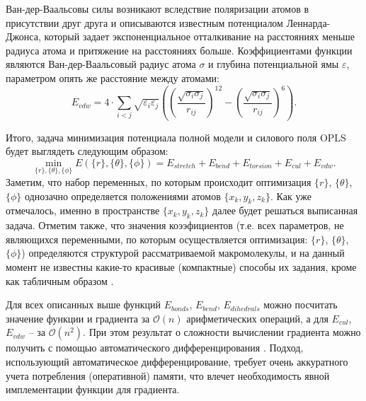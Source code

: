   Ван-дер-Ваальсовы силы возникают вследствие поляризации атомов в присутствии друг друга и описываются известным потенциалом Леннарда-Джонса, который задает экспоненциальное отталкивание на расстояниях меньше радиуса атома и притяжение на расстояниях больше.
  Коэффициентами функции являются Ван-дер-Ваальсовый радиус атома $\sigma$ и глубина потенциальной ямы $\varepsilon$, параметром опять же расстояние между атомами:
  $$
  E_{vdw} = 4 \cdot \sum_{i < j} \sqrt{\varepsilon_i \varepsilon_j} \left( \left( \frac{\sqrt{\sigma_i \sigma_j}}{r_{ij}} \right)^{12} - \left( \frac{\sqrt{\sigma_i \sigma_j}}{r_{ij}} \right)^{6} \right).
  $$

  Итого, задача минимизация потенциала полной модели и силового поля OPLS будет выглядеть следующим образом:
  $$
  \min_{\{r\},\{\theta\},\{\phi\}} {E(\{r\},\{\theta\},\{\phi\}) = E_{stretch} + E_{bend} + E_{torsion} + E_{cul} + E_{vdw}}.
  $$
  Заметим, что набор переменных, по которым происходит оптимизация $\{r\}$, $\{\theta\}$, $\{\phi\}$ однозачно определяется положениями атомов $\{x_k ,y_k ,z_k\}$. Как уже отмечалось, именно в пространстве $\{x_k ,y_k ,z_k\}$ далее будет решаться выписанная задача. Отметим также, что значения коээфициентов (т.е. всех параметров, не являющихся переменными, по которым осуществляется оптимизация: $\{r\}$, $\{\theta\}$, $\{\phi\}$) определяются структурой рассматриваемой макромолекулы, и на данный момент не известны какие-то красивые (компактные) способы их задания, кроме как табличным образом \cite{Jorgensen1996}.


  Для всех описанных выше функций $E_{bonds}$, $E_{bend}$, $E_{dihedrals}$ можно посчитать значение функции и градиента за $\mathcal{O}\left( n \right)$ арифметических операций, а для $E_{cul}$, $E_{vdw}$ -- за $\mathcal{O}\left( n^2 \right)$.
  При этом результат о сложности вычислении градиента можно получить с помощью автоматического дифференцирования \cite{nocedal2006sequential}. Подход, использующий автоматическое дифференцирование, требует очень аккуратного учета потребления (оперативной) памяти, что влечет необходимость явной имплементации функции для градиента.

